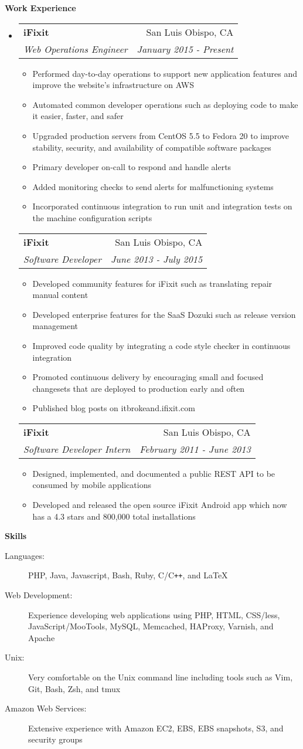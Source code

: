 \documentclass[letterpaper,11pt]{article}
\makeatletter
\newcommand{\resitem}[1]{\item #1 \vspace{-2pt}}
\newcommand{\resheading}[1]{{\large \colorbox{mygrey}{\begin{minipage}{\textwidth}{\textbf{#1 \vphantom{p\^{E}}}}\end{minipage}}}}
\newcommand{\ressubheading}[4]{
\begin{tabular*}{7.0in}{l@{\extracolsep{\fill}}r}
      \textbf{#1} & #2 \\
      \textit{#3} & \textit{#4} \\
\end{tabular*}\vspace{-6pt}}
\makeatother
\begin{document}
\resheading{Work Experience}
\begin{itemize}
\item
   \ressubheading{iFixit}{San Luis Obispo, CA}{Web Operations Engineer}{January 2015 - Present}
   \begin{itemize}
      \resitem{Performed day-to-day operations to support new application features and improve the website's infrastructure on AWS}
      \resitem{Automated common developer operations such as deploying code to make it easier, faster, and safer}
      \resitem{Upgraded production servers from CentOS 5.5 to Fedora 20 to improve stability, security, and availability of compatible software packages}
      \resitem{Primary developer on-call to respond and handle alerts}
      \resitem{Added monitoring checks to send alerts for malfunctioning systems}
      \resitem{Incorporated continuous integration to run unit and integration tests on the machine configuration scripts}
   \end{itemize}
   \ressubheading{iFixit}{San Luis Obispo, CA}{Software Developer}{June 2013 - July 2015}
   \begin{itemize}
      \resitem{Developed community features for iFixit such as translating repair manual content}
      \resitem{Developed enterprise features for the SaaS Dozuki such as release version management}
      \resitem{Improved code quality by integrating a code style checker in continuous integration}
      \resitem{Promoted continuous delivery by encouraging small and focused changesets that are deployed to production early and often}
      \resitem{Published blog posts on itbrokeand.ifixit.com}
   \end{itemize}
   \ressubheading{iFixit}{San Luis Obispo, CA}{Software Developer Intern}{February 2011 - June 2013}
   \begin{itemize}
      \resitem{Designed, implemented, and documented a public REST API to be consumed by mobile applications}
      \resitem{Developed and released the open source iFixit Android app which now has a 4.3 stars and 800,000 total installations}
   \end{itemize}
\end{itemize}

\resheading{Skills}

\begin{description}
\item[Languages:]
PHP, Java, Javascript, Bash, Ruby, C/C{}\verb!++!, and \LaTeX
\item[Web Development:]
Experience developing web applications using PHP, HTML, CSS/less, JavaScript/MooTools, MySQL, Memcached, HAProxy, Varnish, and Apache
\item[Unix:]
Very comfortable on the Unix command line including tools such as Vim, Git, Bash, Zsh, and tmux
\item[Amazon Web Services:]
Extensive experience with Amazon EC2, EBS, EBS snapshots, S3, and security groups
\end{description}
\end{document}
